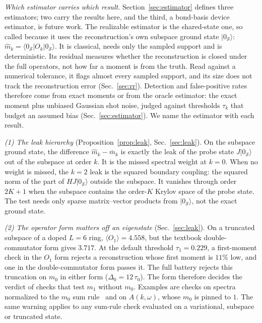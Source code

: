 \documentclass[submission, PhysCore]{SciPost}
\begin{document}
\emph{Which estimator carries which result.} Section~\ref{sec:estimator} defines three estimators; two carry the results here, and the third, a bond-basis device estimator, is future work. The realizable estimator is the shared-state one, so called because it uses the reconstruction's own subspace ground state $|0_\mathcal S\rangle$: $\widehat m_k=\langle 0_\mathcal S|O_k|0_\mathcal S\rangle$. It is classical, needs only the sampled support and is deterministic. Its residual measures whether the reconstruction is closed under the full operators, not how far a moment is from the truth. Read against a numerical tolerance, it flags almost every sampled support, and its size does not track the reconstruction error (Sec.~\ref{sec:rr}). Detection and false-positive rates therefore come from exact moments or from the oracle estimator: the exact moment plus unbiased Gaussian shot noise, judged against thresholds $\tau_k$ that budget an assumed bias (Sec.~\ref{sec:estimator}). We name the estimator with each result.

\emph{(1) The leak hierarchy} (Proposition~\ref{prop:leak}, Sec.~\ref{sec:leak}). On the subspace ground state, the difference $\widehat m_k-\bar m_k$ is exactly the leak of the probe state $J|0_\mathcal S\rangle$ out of the subspace at order $k$. It is the missed spectral weight at $k=0$. When no weight is missed, the $k=2$ leak is the squared boundary coupling: the squared norm of the part of $HJ|0_\mathcal S\rangle$ outside the subspace. It vanishes through order $2K+1$ when the subspace contains the order-$K$ Krylov space of the probe state. The test needs only sparse matrix--vector products from $|0_\mathcal S\rangle$, not the exact ground state.

\emph{(2) The operator form matters off an eigenstate} (Sec.~\ref{sec:leak}). On a truncated subspace of a doped $L=6$ ring, $\langle O_1\rangle=4.558$, but the textbook double-commutator form gives $3.717$. At the default threshold $\tau_1=0.229$, a first-moment check in the $O_1$ form rejects a reconstruction whose first moment is $11\%$ low, and one in the double-commutator form passes it. The full battery rejects this truncation on $m_0$ in either form ($\Delta_0=12\,\tau_0$). The form therefore decides the verdict of checks that test $m_1$ without $m_0$. Examples are checks on spectra normalized to the $m_0$ sum rule~\cite{RoggeroCarlson2019} and on $A(k,\omega)$, whose $m_0$ is pinned to $1$. The same warning applies to any sum-rule check evaluated on a variational, subspace or truncated state.
\end{document}
